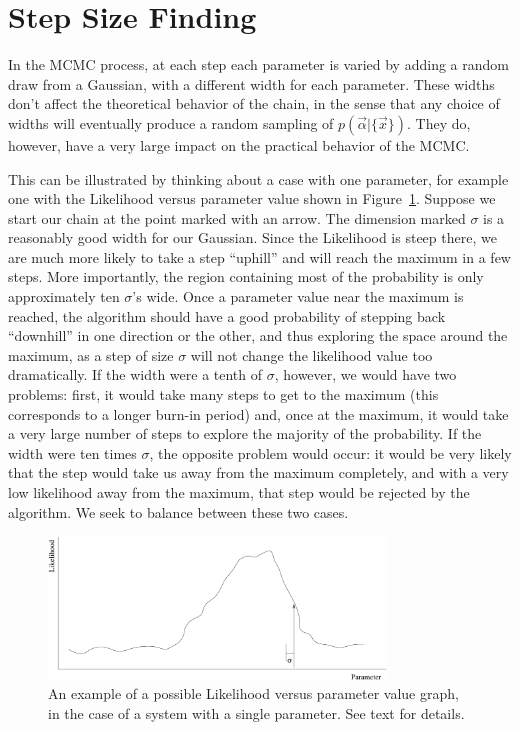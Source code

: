 \section{Step Size Finding}
\label{rott:StepSizeFinding}
In the MCMC process, at each step each parameter is varied by adding a
random draw from a Gaussian, with a different width for each
parameter.  These widths don't affect the theoretical behavior of the
chain, in the sense that any choice of widths will eventually produce
a random sampling of $p(\vec{\alpha}|\{\vec{x}\})$.  They do, however,
have a very large impact on the practical behavior of the MCMC.  

This can be illustrated by thinking about a case with one parameter,
for example one with the Likelihood versus parameter value shown in
\mbox{Figure \ref{LikelihoodExample}}.  Suppose we start our chain at
the point marked with an arrow.  The dimension marked $\sigma$ is a
reasonably good width for our Gaussian.  Since the Likelihood is steep
there, we are much more likely to take a step ``uphill'' and will
reach the maximum in a few steps.  More importantly, the region
containing most of the probability is only approximately ten
$\sigma$'s wide.  Once a parameter value near the maximum is reached,
the algorithm should have a good probability of stepping back
``downhill'' in one direction or the other, and thus exploring the
space around the maximum, as a step of size $\sigma$ will not change
the likelihood value too dramatically.  If the width were a tenth of
$\sigma$, however, we would have two problems: first, it would take
many steps to get to the maximum (this corresponds to a longer burn-in
period) and, once at the maximum, it would take a very large number of
steps to explore the majority of the probability.  If the width were
ten times $\sigma$, the opposite problem would occur: it would be very
likely that the step would take us away from the maximum completely,
and with a very low likelihood away from the maximum, that step would
be rejected by the algorithm.  We seek to balance between these
two cases.

\begin{figure}[tb]
\centering
\includegraphics[width=0.8\textwidth]{Figures/MCMC/LikelihoodExample}
\caption[Example Likelihood v. parameter]{ An example of a possible
Likelihood versus parameter value graph, in the case of a system with
a single parameter.  See text for details.
\label{LikelihoodExample}}
\end{figure}

